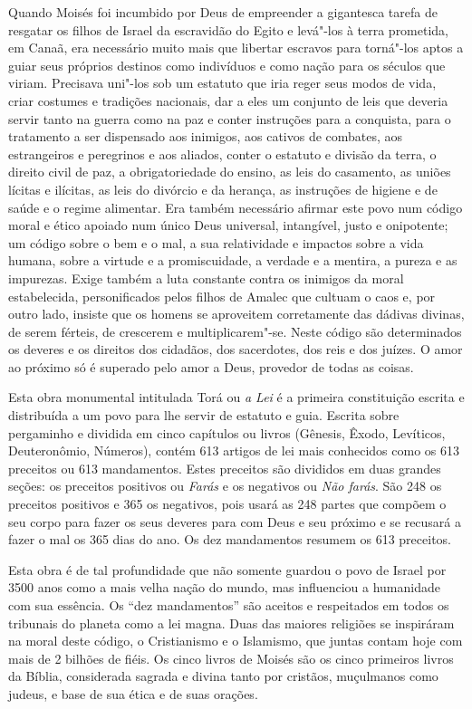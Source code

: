 Quando Moisés foi incumbido por Deus de empreender a gigantesca tarefa de resgatar os filhos de Israel da escravidão do Egito e levá"-los à terra prometida, em Canaã, era necessário muito mais que libertar escravos para torná"-los aptos a guiar seus próprios destinos como indivíduos e como nação para os séculos que viriam. Precisava uni"-los sob um estatuto que iria reger seus modos de vida, criar costumes e tradições nacionais, dar a eles um conjunto de leis que deveria servir tanto na guerra como na paz e conter instruções para a conquista, para o tratamento a ser dispensado aos inimigos, aos cativos de combates, aos estrangeiros e peregrinos e aos aliados, conter o estatuto e divisão da terra, o direito civil de paz, a obrigatoriedade do ensino, as leis do casamento, as uniões lícitas e ilícitas, as leis do divórcio e da herança, as instruções de higiene e de saúde e o regime alimentar. Era também necessário afirmar este povo num código moral e ético apoiado num único Deus universal, intangível, justo e onipotente; um código sobre o bem e o mal, a sua relatividade e impactos sobre a vida humana, sobre a virtude e a promiscuidade, a verdade e a mentira, a pureza e as impurezas. Exige também a luta constante contra os inimigos da moral estabelecida, personificados pelos filhos de Amalec que cultuam o caos e, por outro lado, insiste que os homens se aproveitem corretamente das dádivas divinas, de serem férteis, de crescerem e multiplicarem"-se. Neste código são determinados os deveres e os direitos dos cidadãos, dos sacerdotes, dos reis e dos juízes. O amor ao próximo só é superado pelo amor a Deus, provedor de todas as coisas.

Esta obra monumental intitulada Torá ou \emph{a Lei} é a
primeira constituição escrita e distribuída a um povo para lhe servir
de estatuto e guia. Escrita sobre pergaminho e dividida em cinco capítulos
ou livros (Gênesis, Êxodo, Levíticos, Deuteronômio, Números), contém 613
artigos de lei mais conhecidos como os 613 preceitos ou 613 mandamentos.
Estes preceitos são divididos em duas grandes seções: os preceitos
positivos ou \emph{Farás} e os negativos ou \emph{Não farás}. São 248 os
preceitos positivos e 365 os negativos, pois usará as 248 partes que
compõem o seu corpo para fazer os seus deveres para com Deus e seu
próximo e se recusará a fazer o mal os 365 dias do ano. Os dez
mandamentos resumem os 613 preceitos.

Esta obra é de tal profundidade que não somente guardou o povo de Israel
por 3500 anos como a mais velha nação do mundo, mas influenciou a
humanidade com sua essência. Os ``dez mandamentos'' são aceitos e
respeitados em todos os tribunais do planeta como a lei magna. Duas das
maiores religiões se inspiráram na moral deste código, o Cristianismo e
o Islamismo, que juntas contam hoje com mais de 2 bilhões de fiéis. Os
cinco livros de Moisés são os cinco primeiros livros da Bíblia,
considerada sagrada e divina tanto por cristãos, muçulmanos como judeus,
e base de sua ética e de suas orações.

